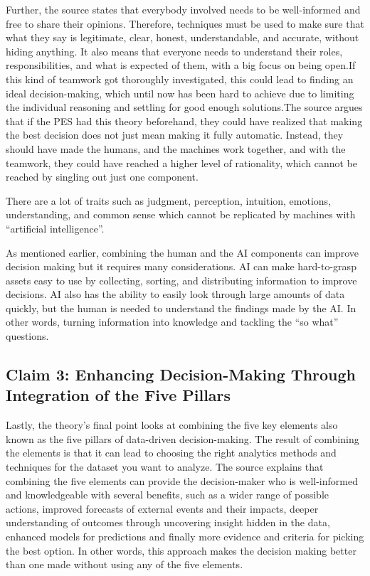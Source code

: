 Further, the source states that everybody involved needs to be well-informed and free to share their opinions. Therefore, techniques must be used to make sure that what they say is legitimate, clear, honest, understandable, and accurate, without hiding anything. It also means that everyone needs to understand their roles, responsibilities, and what is expected of them, with a big focus on being open.If this kind of teamwork got thoroughly investigated, this could lead to finding an ideal decision-making, which until now has been hard to achieve due to limiting the individual reasoning and settling for good enough solutions.The source argues that if the PES had this theory beforehand, they could have realized that making the best decision does not just mean making it fully automatic. Instead, they should have made the humans, and the machines work together, and with the teamwork, they could have reached a higher level of rationality, which cannot be reached by singling out just one component. 

There are a lot of traits such as judgment, perception, intuition, emotions, understanding, and common sense which cannot be replicated by machines with “artificial intelligence”. 


As mentioned earlier, combining the human and the AI components can improve decision making but it requires many considerations. AI can make hard-to-grasp assets easy to use by collecting, sorting, and distributing information to improve decisions. AI also has the ability to easily look through large amounts of data quickly, but the human is needed to understand the findings made by the AI. In other words, turning information into knowledge and tackling the “so what” questions.


\subsection{Claim 3: Enhancing Decision-Making Through Integration of the Five Pillars}

Lastly, the theory’s final point looks at combining the five key elements also known as the five pillars of data-driven decision-making. The result of combining the elements is that it can lead to choosing the right analytics methods and techniques for the dataset you want to analyze. The source explains that combining the five elements can provide the decision-maker who is well-informed and knowledgeable with several benefits, such as a wider range of possible actions, improved forecasts of external events and their impacts, deeper understanding of outcomes through uncovering insight hidden in the data, enhanced models for predictions and finally more evidence and criteria for picking the best option. In other words, this approach makes the decision making better than one made without using any of the five elements.

